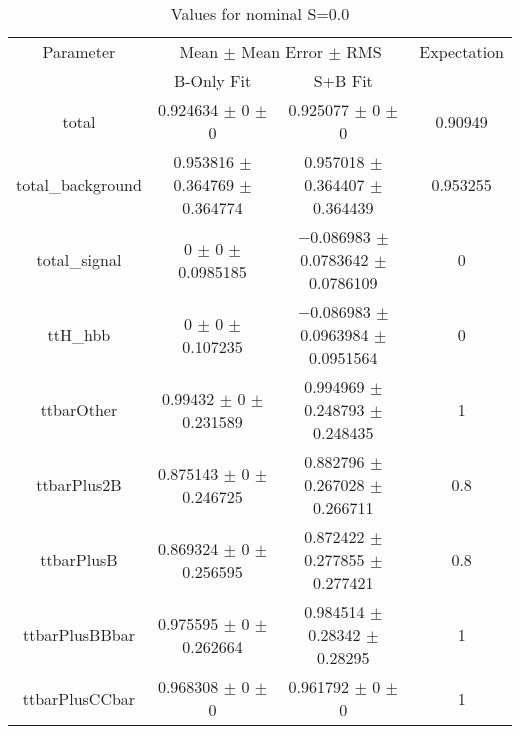 \begin{table}
\centering
\caption{Values for nominal S=0.0}
\begin{tabular}{cccc}
\toprule
Parameter & \multicolumn{2}{c}{Mean $\pm$ Mean Error $\pm$ RMS} & Expectation\\
 & B-Only Fit & S+B Fit & \\
\midrule
total & \num{0.924634} $\pm$ \num{0} $\pm$ \num{0} & \num{0.925077} $\pm$ \num{0} $\pm$ \num{0} & \num{0.90949}\\
total\_background & \num{0.953816} $\pm$ \num{0.364769} $\pm$ \num{0.364774} & \num{0.957018} $\pm$ \num{0.364407} $\pm$ \num{0.364439} & \num{0.953255}\\
total\_signal & \num{0} $\pm$ \num{0} $\pm$ \num{0.0985185} & \num{-0.086983} $\pm$ \num{0.0783642} $\pm$ \num{0.0786109} & \num{0}\\
ttH\_hbb & \num{0} $\pm$ \num{0} $\pm$ \num{0.107235} & \num{-0.086983} $\pm$ \num{0.0963984} $\pm$ \num{0.0951564} & \num{0}\\
ttbarOther & \num{0.99432} $\pm$ \num{0} $\pm$ \num{0.231589} & \num{0.994969} $\pm$ \num{0.248793} $\pm$ \num{0.248435} & \num{1}\\
ttbarPlus2B & \num{0.875143} $\pm$ \num{0} $\pm$ \num{0.246725} & \num{0.882796} $\pm$ \num{0.267028} $\pm$ \num{0.266711} & \num{0.8}\\
ttbarPlusB & \num{0.869324} $\pm$ \num{0} $\pm$ \num{0.256595} & \num{0.872422} $\pm$ \num{0.277855} $\pm$ \num{0.277421} & \num{0.8}\\
ttbarPlusBBbar & \num{0.975595} $\pm$ \num{0} $\pm$ \num{0.262664} & \num{0.984514} $\pm$ \num{0.28342} $\pm$ \num{0.28295} & \num{1}\\
ttbarPlusCCbar & \num{0.968308} $\pm$ \num{0} $\pm$ \num{0} & \num{0.961792} $\pm$ \num{0} $\pm$ \num{0} & \num{1}\\
\bottomrule
\end{tabular}
\end{table}